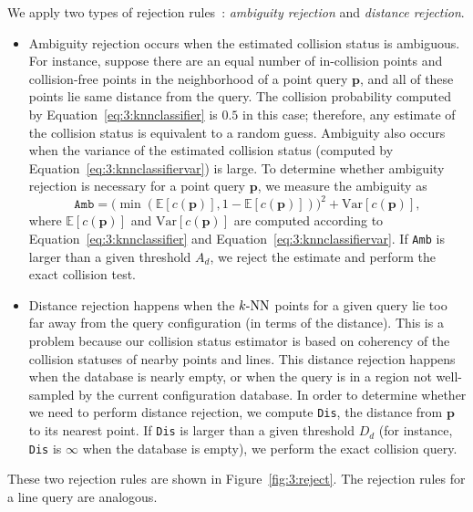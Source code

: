 We apply two types of rejection rules~\cite{Dubuisson:1993:PR}: \emph{ambiguity rejection} and \emph{distance rejection}.
\begin{itemize}
\item Ambiguity rejection occurs when the estimated collision status is ambiguous. For instance, suppose there are an equal number of in-collision points and collision-free points in the neighborhood of a point query $\mathbf p$, and all of these points lie same distance from the query. The collision probability computed by Equation~\ref{eq:3:knnclassifier} is $0.5$ in this case; therefore, any estimate of the collision status is equivalent to a random guess. Ambiguity also occurs when the variance of the estimated collision status (computed by Equation~\ref{eq:3:knnclassifiervar}) is large. To determine whether ambiguity rejection is necessary for a point query $\mathbf p$, we measure the ambiguity as
    \begin{equation}
    \texttt{Amb} = \big(\min(\mathbb E[c(\mathbf p)], 1 - \mathbb E[c(\mathbf p)])\big)^2 + \textrm{Var}[c(\mathbf p)],
    \end{equation}
    where $\mathbb E[c(\mathbf p)]$ and $\textrm{Var}[c(\mathbf p)]$ are computed according to Equation~\ref{eq:3:knnclassifier} and Equation~\ref{eq:3:knnclassifiervar}. If \texttt{Amb} is larger than a given threshold $A_d$, we reject the estimate and perform the exact collision test.

\item Distance rejection happens when the $k\text{-NN}$ points for a given query lie too far away from the query configuration (in terms of the distance). This is a problem because our collision status estimator is based on coherency of the collision statuses of nearby points and lines. This distance rejection happens when the database is nearly empty, or when the query is in a region not well-sampled by the current configuration database.
    In order to determine whether we need to perform distance rejection, we compute \texttt{Dis}, the distance from $\mathbf p$ to its nearest point. If \texttt{Dis} is larger than a given threshold $D_d$ (for instance, \texttt{Dis} is $\infty$ when the database is empty), we perform the exact collision query.
\end{itemize}

These two rejection rules are shown in Figure~\ref{fig:3:reject}. The rejection rules for a line query are analogous.

